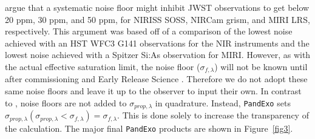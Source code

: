\documentclass[iop]{emulateapj}
\begin{document}
\citet{gre16} argue that a systematic noise floor might inhibit JWST observations to get
below 20 ppm, 30 ppm, and 50 ppm, for NIRISS SOSS, NIRCam grism, and MIRI LRS,
respectively. This argument was based off of a comparison of the lowest noise achieved with
an HST WFC3 G141 observations \citep{kre14} for the NIR instruments and the lowest noise
achieved with a Spitzer Si:As observation \citep{knu09} for MIRI.
However, as with the actual effective saturation limit, the noise floor ($\sigma_{f,\lambda}$) 
will not be known until after commissioning and Early Release Science \citep{ste16}.
Therefore we do not adopt these same noise floors and leave it up to the observer to input
their own. In contrast to \citet{gre16}, noise floors are not added to
$\sigma_{prop,\lambda}$ in quadrature. Instead, \texttt{PandExo} sets
$\sigma_{prop,\lambda}(\sigma_{prop,\lambda}<\sigma_{f,\lambda})=\sigma_{f,\lambda}$. 
This is done solely to increase the transparency of the calculation. The major final \texttt{PandExo} products are shown in Figure~\ref{fig3}. 
\end{document}
